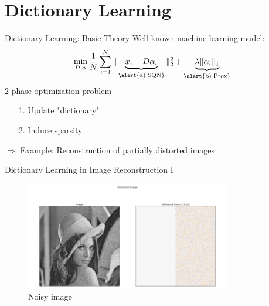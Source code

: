 \documentclass[10pt]{beamer}
\begin{document}
\section{Dictionary Learning}
\begin{frame}{Dictionary Learning: Basic Theory}
	\center Well-known machine learning model:
	\begin{equation*}
	\min_{D, \alpha} \frac{1}{N} \sum_{i=1}^N \|\underbrace{ x_i - D \alpha_i }_{\text{\alert{a) SQN}}}\|_2^2 + \underbrace{\lambda \| 
		\alpha_i \|_1}_{\text{\alert{b) Prox}}}
	\end{equation*}
	\center \alert{ 2-phase optimization problem}
	\begin{itemize}
		\item[1.] Update "dictionary" 
		\item[2.] Induce sparsity
	\end{itemize}
	$\Rightarrow$ Example: Reconstruction of partially distorted images
\end{frame}

\begin{frame}{Dictionary Learning in Image Reconstruction I}
	\begin{figure}[h!]
		\centering
		\includegraphics[width=0.8\textwidth]{lena_noisy.png}
		\caption{Noisy image}
	\end{figure}
\end{frame}
\end{document}
